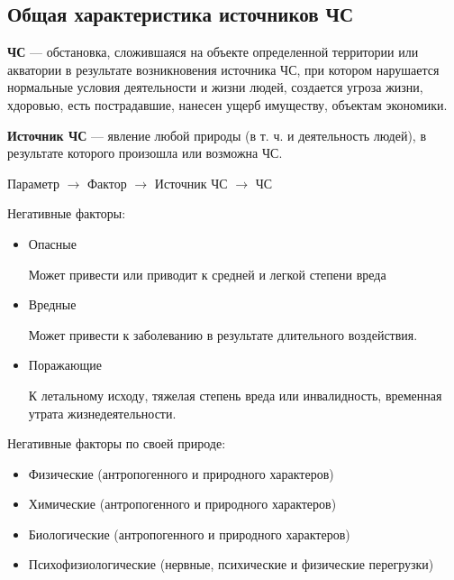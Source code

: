 \textsl{}\documentclass[oneside,final,14pt]{extreport}
\begin{document}
\subsection*{Общая характеристика источников ЧС}
\textbf{ЧС} --- обстановка, сложившаяся на объекте определенной территории или акватории в результате возникновения источника ЧС, при котором нарушается нормальные условия деятельности и жизни людей, создается угроза жизни, хдоровью, есть пострадавшие, нанесен ущерб имуществу, объектам экономики.

\textbf{Источник ЧС} --- явление любой природы (в т. ч. и деятельность людей), в результате которого произошла или возможна ЧС.

Параметр $\to$ Фактор $\to$ Источник ЧС $\to$ ЧС

Негативные факторы:
\begin{itemize}
	\item Опасные
	
	Может привести или приводит к средней и легкой степени вреда
	
	\item Вредные
	
	Может привести к заболеванию в результате длительного воздействия.
	
	\item Поражающие
	
	К летальному исходу, тяжелая степень вреда или инвалидность, временная утрата жизнедеятельности. 
\end{itemize}
Негативные факторы по своей природе:
\begin{itemize}
	\item Физические (антропогенного и природного характеров)
	\item Химические (антропогенного и природного характеров)
	\item Биологические (антропогенного и природного характеров)
	\item Психофизиологические (нервные, психические и физические перегрузки)
\end{itemize}
\end{document}
